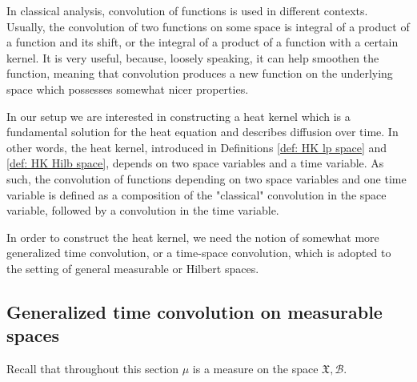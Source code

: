 \documentclass[11pt,reqno]{amsart}
\theoremstyle{remark}
\theoremstyle{definition}
\numberwithin{theorem}{section} \numberwithin{equation}{section}
\newcommand{\X}{\mathfrak{X}}
\begin{document}
In classical analysis, convolution of functions is used in different contexts. Usually, the convolution of two functions on some space is integral of a product of a function and its shift, or the integral of a product of a function with a certain kernel. It is very useful, because, loosely speaking, it can help  smoothen the function, meaning that convolution produces a new function on the underlying space which possesses somewhat nicer properties.

In our setup we are interested in constructing a heat kernel which is a fundamental solution for the heat equation and describes diffusion over time. In other words, the heat kernel, introduced in Definitions \ref{def: HK lp space} and \ref{def: HK Hilb space}, depends on two space variables and a time variable.
As such, the convolution of functions depending on two space variables and one time variable is defined as a composition of the "classical" convolution in the space variable, followed by a convolution in the time variable.

In order to construct the heat kernel,
we need the notion of somewhat more generalized time convolution, or a time-space convolution,
which is adopted to the setting of general measurable or Hilbert spaces.


\medskip





\subsection{Generalized time convolution on measurable spaces}

Recall that throughout this section $\mu$ is a measure on the space $\X,\mathcal{B}$.
\end{document}
